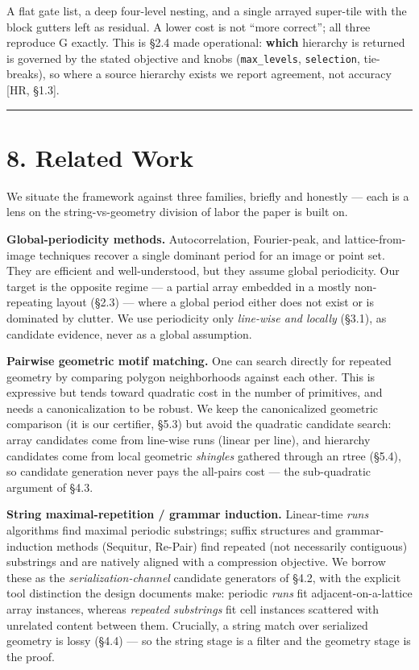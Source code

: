 \documentclass[
  11pt,
]{article}
\begin{document}
A flat gate list, a deep four-level nesting, and a single arrayed
super-tile with the block gutters left as residual. A lower cost is not
``more correct''; all three reproduce G exactly. This is §2.4 made
operational: \textbf{which} hierarchy is returned is governed by the
stated objective and knobs (\texttt{max\_levels}, \texttt{selection},
tie-breaks), so where a source hierarchy exists we report agreement, not
accuracy {[}HR, §1.3{]}.

\begin{center}\rule{0.5\linewidth}{0.5pt}\end{center}

\section{8. Related Work}\label{related-work}

We situate the framework against three families, briefly and honestly
--- each is a lens on the string-vs-geometry division of labor the paper
is built on.

\textbf{Global-periodicity methods.} Autocorrelation, Fourier-peak, and
lattice-from-image techniques recover a single dominant period for an
image or point set. They are efficient and well-understood, but they
assume global periodicity. Our target is the opposite regime --- a
partial array embedded in a mostly non-repeating layout (§2.3) --- where
a global period either does not exist or is dominated by clutter. We use
periodicity only \emph{line-wise and locally} (§3.1), as candidate
evidence, never as a global assumption.

\textbf{Pairwise geometric motif matching.} One can search directly for
repeated geometry by comparing polygon neighborhoods against each other.
This is expressive but tends toward quadratic cost in the number of
primitives, and needs a canonicalization to be robust. We keep the
canonicalized geometric comparison (it is our certifier, §5.3) but avoid
the quadratic candidate search: array candidates come from line-wise
runs (linear per line), and hierarchy candidates come from local
geometric \emph{shingles} gathered through an rtree (§5.4), so candidate
generation never pays the all-pairs cost --- the sub-quadratic argument
of §4.3.

\textbf{String maximal-repetition / grammar induction.} Linear-time
\emph{runs} algorithms find maximal periodic substrings; suffix
structures and grammar-induction methods (Sequitur, Re-Pair) find
repeated (not necessarily contiguous) substrings and are natively
aligned with a compression objective. We borrow these as the
\emph{serialization-channel} candidate generators of §4.2, with the
explicit tool distinction the design documents make: periodic
\emph{runs} fit adjacent-on-a-lattice array instances, whereas
\emph{repeated substrings} fit cell instances scattered with unrelated
content between them. Crucially, a string match over serialized geometry
is lossy (§4.4) --- so the string stage is a filter and the geometry
stage is the proof.
\end{document}
